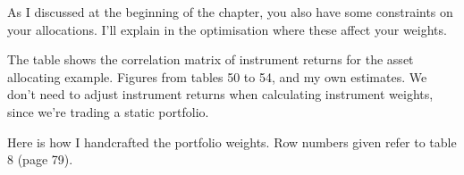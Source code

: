 As I discussed at the beginning of the chapter, you also have some constraints on your allocations. I'll explain in the optimisation where these affect your weights.

 \begingroup \scriptsize \setlength{\tabcolsep}{3pt} \renewcommand{\arraystretch}{1.08}
\endgroup

The table shows the correlation matrix of instrument returns for the asset allocating example. Figures from tables 50 to 54, and my own estimates. We don’t need to adjust instrument returns when calculating instrument weights, since we’re trading a static portfolio.

Here is how I handcrafted the portfolio weights. Row numbers given refer to table 8 (page 79).

